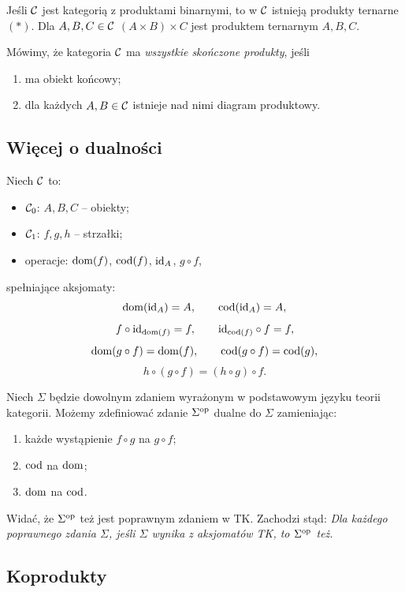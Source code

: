 \begin{stwierdzenie}
Jeśli $\mathcal{C}$ jest kategorią z produktami binarnymi, to w $\mathcal{C}$ istnieją produkty ternarne $(\ast)$. Dla $A, B, C \in \mathcal{C}$ $(A \times B) \times C$ jest produktem ternarnym $A, B, C$.
\end{stwierdzenie}

\begin{definicja}
Mówimy, że kategoria $\mathcal{C}$ ma \emph{wszystkie skończone produkty}, jeśli
\begin{enumerate}
\item ma obiekt końcowy;
\item dla każdych $A, B \in \mathcal{C}$ istnieje nad nimi diagram produktowy.
\end{enumerate}
\end{definicja}

\subsection*{Więcej o dualności}

Niech $\mathcal{C}$ to:
\begin{itemize}
\item $\mathcal{C}_0$: $A, B, C$ -- obiekty;
\item $\mathcal{C}_1$: $f, g, h$ -- strzałki;
\item operacje: $\mathrm{dom}(f)$, $\mathrm{cod}(f)$, $\mathrm{id}_A$, $g \circ f$,
\end{itemize}
spełniające aksjomaty:
\[
\mathrm{dom}(\mathrm{id}_A) = A, \qquad \mathrm{cod}(\mathrm{id}_A) = A,
\]
\[
f \circ \mathrm{id}_{\mathrm{dom}(f)} = f, \qquad \mathrm{id}_{\mathrm{cod}(f)} \circ f = f,
\]
\[
\mathrm{dom}(g \circ f) = \mathrm{dom}(f), \qquad \mathrm{cod}(g \circ f) = \mathrm{cod}(g),
\]
\[
h \circ (g \circ f) = (h \circ g) \circ f.
\]

Niech $\Sigma$ będzie dowolnym zdaniem wyrażonym w podstawowym języku teorii kategorii. Możemy zdefiniować zdanie $\Sigma^{\mathrm{op}}$ dualne do $\Sigma$ zamieniając:
\begin{enumerate}
\item każde wystąpienie $f \circ g$ na $g \circ f$;
\item $\mathrm{cod}$ na $\mathrm{dom}$;
\item $\mathrm{dom}$ na $\mathrm{cod}$.
\end{enumerate}

Widać, że $\Sigma^{\mathrm{op}}$ też jest poprawnym zdaniem w TK. Zachodzi stąd: \emph{Dla każdego poprawnego zdania $\Sigma$, jeśli $\Sigma$ wynika z aksjomatów TK, to $\Sigma^{\mathrm{op}}$ też.}

\subsection*{Koprodukty}

